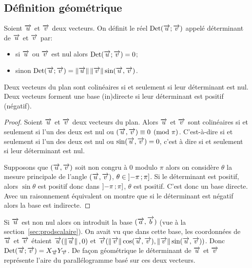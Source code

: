 \subsection{Définition géométrique}
\begin{defdef}
  Soient \(\overrightarrow{u}\) et \(\overrightarrow{v}\) deux vecteurs. On définit le réel \(\operatorname{Det}(\overrightarrow{u};\overrightarrow{v})\) appelé déterminant de \(\overrightarrow{u}\) et \(\overrightarrow{v}\) par:
  \begin{itemize}
  \item si \(\overrightarrow{u}\) ou \(\overrightarrow{v}\) est nul alors \(\operatorname{Det}(\overrightarrow{u};\overrightarrow{v})=0\);
  \item sinon \(\operatorname{Det}(\overrightarrow{u};\overrightarrow{v})=\left\lVert\overrightarrow{u}\right\rVert\left\lVert\overrightarrow{v}\right\rVert \sin(\overrightarrow{u},\overrightarrow{v})\).
  \end{itemize}
\end{defdef}
\begin{prop}
  Deux vecteurs du plan sont colinéaires si et seulement si leur déterminant est nul. Deux vecteurs forment une base (in)directe si leur déterminant est positif (négatif).
\end{prop}
\begin{proof}
  Soient \(\overrightarrow{u}\) et \(\overrightarrow{v}\) deux vecteurs du plan. Alors \(\overrightarrow{u}\) et \(\overrightarrow{v}\) sont colinéaires si et seulement si l'un des deux est nul ou \((\overrightarrow{u},\overrightarrow{v}) \equiv 0 \pmod {\pi}\). C'est-à-dire si et seulement si l'un des deux est nul ou \( \sin(\overrightarrow{u},\overrightarrow{v}) = 0\), c'est à dire si et seulement si leur déterminant est nul.

  Supposons que \((\overrightarrow{u},\overrightarrow{v})\) soit non congru à 0 modulo \(\pi\) alors on considère \(\theta\) la mesure principale de l'angle \((\overrightarrow{u},\overrightarrow{v})\), \(\theta \in \left] -\pi \, ;  \pi \right]\). Si le déterminant est positif, alors \(\sin \theta\) est positif donc dans \(\left] -\pi \, ;  \pi  \right]\), \(\theta\) est positif. C'est donc un base directe. Avec un raisonnement équivalent on montre que si le déterminant est négatif alors la base est indirecte.
\end{proof}

Si \(\overrightarrow{u}\) est non nul alors on introduit la base \((\overrightarrow{a},\overrightarrow{b})\) (vue à la section~\ref{sec:prodscalaire}). On avait vu que dans cette base, les coordonnées de \(\overrightarrow{u}\) et \(\overrightarrow{v}\) étaient \(\overrightarrow{u}(\left\lVert\overrightarrow{u}\right\rVert,0)\) et \(\overrightarrow{v}(\left\lVert\overrightarrow{v}\right\rVert \cos(\overrightarrow{u},\overrightarrow{v}),\left\lVert\overrightarrow{v}\right\rVert \sin(\overrightarrow{u},\overrightarrow{v}))\). Donc \(\operatorname{Det}(\overrightarrow{u};\overrightarrow{v})=X_{\overrightarrow{u}} Y_{\overrightarrow{v}}\). De façon géométrique le déterminant de \(\overrightarrow{u}\) et \(\overrightarrow{v}\) représente l'aire du parallélogramme basé sur ces deux vecteurs.

